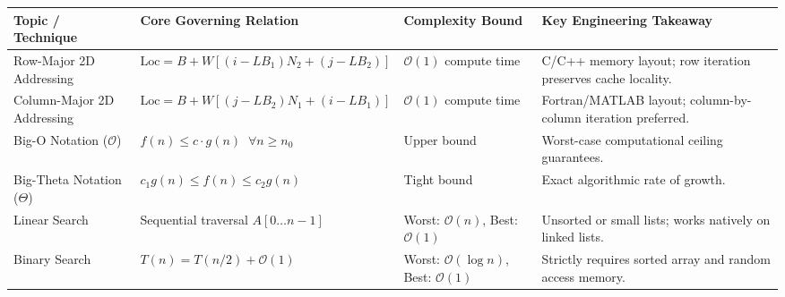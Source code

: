 \documentclass[12pt,a4paper]{article}
\renewcommand{\arraystretch}{1.45}
\begin{document}
\vspace{3pt}

\begin{tcolorbox}[tikzbox, title={\textbf{Summary Matrix: Comprehensive Comparison of Searching and Analysis Fundamentals}}]
\par\vspace{2pt}\noindent
\begingroup
\footnotesize
\setlength{\tabcolsep}{3.5pt}
\setlength{\extrarowheight}{1.5pt}
\renewcommand{\arraystretch}{1.15}
\begin{tabularx}{\linewidth}{|B{2.4cm}|B{3.2cm}|B{2.8cm}|Y|}
\hline
\textbf{Topic / Technique} & \textbf{Core Governing Relation} & \textbf{Complexity Bound} & \textbf{Key Engineering Takeaway} \\
\hline
Row-Major 2D Addressing & $\text{Loc} = B + W[(i-LB_1)N_2 + (j-LB_2)]$ & $\mathcal{O}(1)$ compute time & C/C++ memory layout; row iteration preserves cache locality. \\
\hline
Column-Major 2D Addressing & $\text{Loc} = B + W[(j-LB_2)N_1 + (i-LB_1)]$ & $\mathcal{O}(1)$ compute time & Fortran/MATLAB layout; column-by-column iteration preferred. \\
\hline
Big-O Notation ($\mathcal{O}$) & $f(n) \le c \cdot g(n) \;\; \forall n \ge n_0$ & Upper bound & Worst-case computational ceiling guarantees. \\
\hline
Big-Theta Notation ($\Theta$) & $c_1 g(n) \le f(n) \le c_2 g(n)$ & Tight bound & Exact algorithmic rate of growth. \\
\hline
Linear Search & Sequential traversal $A[0 \dots n-1]$ & Worst: $\mathcal{O}(n)$, Best: $\mathcal{O}(1)$ & Unsorted or small lists; works natively on linked lists. \\
\hline
Binary Search & $T(n) = T(n/2) + \mathcal{O}(1)$ & Worst: $\mathcal{O}(\log n)$, Best: $\mathcal{O}(1)$ & Strictly requires sorted array and random access memory. \\
\hline
\end{tabularx}
\endgroup
\end{tcolorbox}
\end{document}
